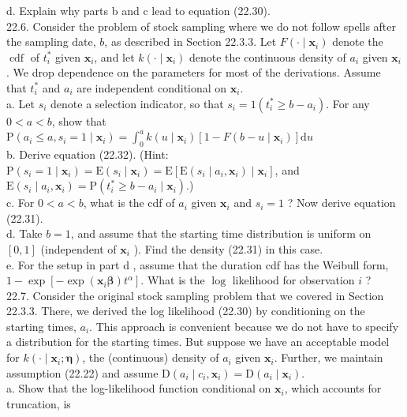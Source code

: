 \documentclass[10pt]{article}
\begin{document}
d. Explain why parts b and c lead to equation (22.30).\\
22.6. Consider the problem of stock sampling where we do not follow spells after the sampling date, $b$, as described in Section 22.3.3. Let $F\left(\cdot \mid \mathbf{x}_{i}\right)$ denote the $\operatorname{cdf}$ of $t_{i}^{*}$ given $\mathbf{x}_{i}$, and let $k\left(\cdot \mid \mathbf{x}_{i}\right)$ denote the continuous density of $a_{i}$ given $\mathbf{x}_{i}$. We drop dependence on the parameters for most of the derivations. Assume that $t_{i}^{*}$ and $a_{i}$ are independent conditional on $\mathbf{x}_{i}$.\\
a. Let $s_{i}$ denote a selection indicator, so that $s_{i}=1\left(t_{i}^{*} \geq b-a_{i}\right)$. For any $0<a<b$, show that\\
$\mathrm{P}\left(a_{i} \leq a, s_{i}=1 \mid \mathbf{x}_{i}\right)=\int_{0}^{a} k\left(u \mid \mathbf{x}_{i}\right)\left[1-F\left(b-u \mid \mathbf{x}_{i}\right)\right] \mathrm{d} u$\\
b. Derive equation (22.32). (Hint: $\mathrm{P}\left(s_{i}=1 \mid \mathbf{x}_{i}\right)=\mathrm{E}\left(s_{i} \mid \mathbf{x}_{i}\right)=\mathrm{E}\left[\mathrm{E}\left(s_{i} \mid a_{i}, \mathbf{x}_{i}\right) \mid \mathbf{x}_{i}\right]$, and $\mathrm{E}\left(s_{i} \mid a_{i}, \mathbf{x}_{i}\right)=\mathrm{P}\left(t_{i}^{*} \geq b-a_{i} \mid \mathbf{x}_{i}\right)$.)\\
c. For $0<a<b$, what is the cdf of $a_{i}$ given $\mathbf{x}_{i}$ and $s_{i}=1$ ? Now derive equation (22.31).\\
d. Take $b=1$, and assume that the starting time distribution is uniform on $[0,1]$ (independent of $\mathbf{x}_{i}$ ). Find the density (22.31) in this case.\\
e. For the setup in part d , assume that the duration cdf has the Weibull form, $1-\exp \left[-\exp \left(\mathbf{x}_{i} \boldsymbol{\beta}\right) t^{\alpha}\right]$. What is the $\log$ likelihood for observation $i$ ?\\
22.7. Consider the original stock sampling problem that we covered in Section 22.3.3. There, we derived the log likelihood (22.30) by conditioning on the starting times, $a_{i}$. This approach is convenient because we do not have to specify a distribution for the starting times. But suppose we have an acceptable model for $k\left(\cdot \mid \mathbf{x}_{i} ; \boldsymbol{\eta}\right)$, the (continuous) density of $a_{i}$ given $\mathbf{x}_{i}$. Further, we maintain assumption (22.22) and assume $\mathrm{D}\left(a_{i} \mid c_{i}, \mathbf{x}_{i}\right)=\mathrm{D}\left(a_{i} \mid \mathbf{x}_{i}\right)$.\\
a. Show that the log-likelihood function conditional on $\mathbf{x}_{i}$, which accounts for truncation, is
\end{document}
